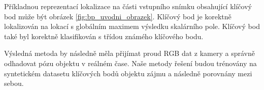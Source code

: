 Příkladnou reprezentací lokalizace na části vstupního snímku obsahující klíčový bod může být obrázek \ref{fig:bp_uvodni_obrazek}. Klíčový bod je korektně lokalizován na lokací s globálním maximem výsledku skalárního pole. Klíčový bod také byl korektně klasifikován s třídou známého klíčového bodu.

Výsledná metoda by následně měla přijímat proud RGB dat z kamery a správně odhadovat pózu objektu v reálném čase. Naše metody řešení budou trénovány na syntetickém datasetu klíčových bodů objektu zájmu a následně porovnány mezi sebou.
\endinput